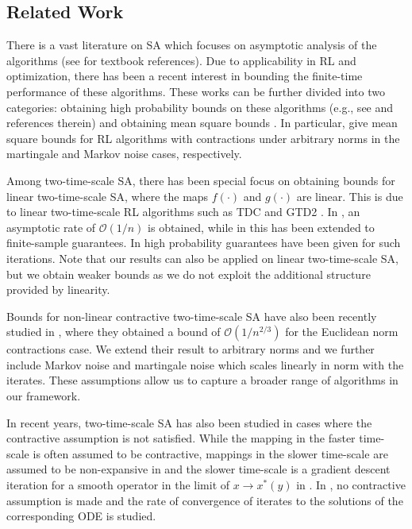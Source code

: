 \documentclass[letterpaper, 10 pt, conference]{ieeeconf}  %
\theoremstyle{definition}
\theoremstyle{plain}
\newcommand{\xstar}{x^*}
\begin{document}
\subsection{Related Work}
There is a vast literature on SA which focuses on asymptotic analysis of the algorithms (see \cite{Kushner, Borkar-book} for textbook references). Due to applicability in RL and optimization, there has been a recent interest in bounding the finite-time performance of these algorithms. These works can be further divided into two categories: obtaining high probability bounds on these algorithms (e.g., see \cite{Chandak_conc, chen-conc} and references therein) and obtaining mean square bounds \cite{srikant2019finite, qu2020finite, haque2024stochastic, chen2024lyapunov, zhang2024constant}. In particular, \cite{chenfinite, chen2024lyapunov} give mean square bounds for RL algorithms with contractions under arbitrary norms in the martingale and Markov noise cases, respectively. 

Among two-time-scale SA, there has been special focus on obtaining bounds for linear two-time-scale SA, where the maps $f(\cdot)$ and $g(\cdot)$ are linear. This is due to linear two-time-scale RL algorithms such as TDC and GTD2 \cite{tdc}. In \cite{konda}, an asymptotic rate of $\mathcal{O}(1/n)$ is obtained, while in \cite{Shaan, Kaledin} this has been extended to finite-sample guarantees. In \cite{Dalal} high probability guarantees have been given for such iterations. Note that our results can also be applied on linear two-time-scale SA, but we obtain weaker bounds as we do not exploit the additional structure provided by linearity.

Bounds for non-linear contractive two-time-scale SA have also been recently studied in  \cite{Doan}, where they obtained a bound of $\mathcal{O}(1/n^{2/3})$ for the Euclidean norm contractions case. We extend their result to arbitrary norms and we further include Markov noise and martingale noise which scales linearly in norm with the iterates. These assumptions allow us to capture a broader range of algorithms in our framework. 

In recent years, two-time-scale SA has also been studied in cases where the contractive assumption is not satisfied. While the mapping in the faster time-scale is often assumed to be contractive, mappings in the slower time-scale are assumed to be non-expansive in \cite{Chandak-nonexp} and the slower time-scale is a gradient descent iteration for a smooth operator in the limit of $x\rightarrow\xstar(y)$ in \cite{Doan-grad}. In \cite{Borkar-alekseev}, no contractive assumption is made and the rate of convergence of iterates to the solutions of the corresponding ODE is studied.
\end{document}
